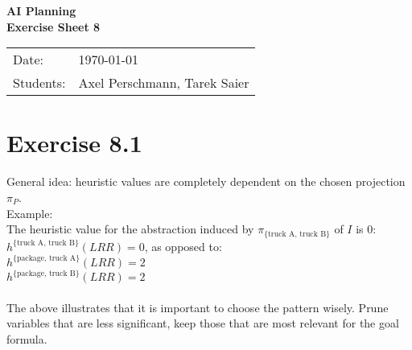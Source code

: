 \documentclass[11pt,a4paper]{article}
\newcommand{\sheetNr}{8}
\begin{document}
\begin{center}
\Huge{\textbf{AI Planning}}\\
\LARGE{\textbf{Exercise Sheet \sheetNr}}
\end{center}
\vspace{2cm}
\begin{tabular}{ll}
Date: & \today\\
Students: & Axel Perschmann, Tarek Saier
\end{tabular}

\section*{Exercise 8.1}
General idea: heuristic values are completely dependent on the chosen projection $\pi_P$.\\
Example:\\
The heuristic value for the abstraction induced by $\pi_{\text{\{truck A, truck B}\}}$ of $I$ is 0:\\
$h^{\text{\{truck A, truck B\}}}(LRR)=0$, as opposed to:\\
$h^{\text{\{package, truck A\}}}(LRR)=2$\\
$h^{\text{\{package, truck B\}}}(LRR)=2$\\
\\
The above illustrates that it is important to choose the pattern wisely. Prune variables that are less significant, keep those that are most relevant for the goal formula.\\
\end{document}
